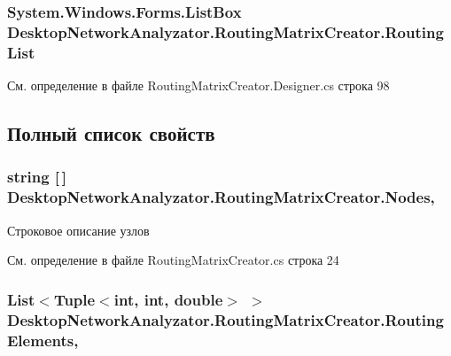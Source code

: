 \subsubsection[{\texorpdfstring{Routing\+List}{RoutingList}}]{\setlength{\rightskip}{0pt plus 5cm}System.\+Windows.\+Forms.\+List\+Box Desktop\+Network\+Analyzator.\+Routing\+Matrix\+Creator.\+Routing\+List\hspace{0.3cm}{\ttfamily [private]}}\hypertarget{class_desktop_network_analyzator_1_1_routing_matrix_creator_a2c4d079f5296a093c22406fe7abffe79}{}\label{class_desktop_network_analyzator_1_1_routing_matrix_creator_a2c4d079f5296a093c22406fe7abffe79}


См. определение в файле Routing\+Matrix\+Creator.\+Designer.\+cs строка 98



\subsection{Полный список свойств}
\subsubsection[{\texorpdfstring{Nodes}{Nodes}}]{\setlength{\rightskip}{0pt plus 5cm}string \mbox{[}$\,$\mbox{]} Desktop\+Network\+Analyzator.\+Routing\+Matrix\+Creator.\+Nodes\hspace{0.3cm}{\ttfamily [get]}, {\ttfamily [set]}}\hypertarget{class_desktop_network_analyzator_1_1_routing_matrix_creator_a3814334afe7686918cfe53e19464a3a7}{}\label{class_desktop_network_analyzator_1_1_routing_matrix_creator_a3814334afe7686918cfe53e19464a3a7}


Строковое описание узлов 



См. определение в файле Routing\+Matrix\+Creator.\+cs строка 24

\subsubsection[{\texorpdfstring{Routing\+Elements}{RoutingElements}}]{\setlength{\rightskip}{0pt plus 5cm}List$<$Tuple$<$int, int, double$>$ $>$ Desktop\+Network\+Analyzator.\+Routing\+Matrix\+Creator.\+Routing\+Elements\hspace{0.3cm}{\ttfamily [get]}, {\ttfamily [set]}}\hypertarget{class_desktop_network_analyzator_1_1_routing_matrix_creator_ad3dfc8b1d4eb526017b4515003533186}{}\label{class_desktop_network_analyzator_1_1_routing_matrix_creator_ad3dfc8b1d4eb526017b4515003533186}


